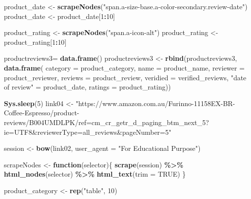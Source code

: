 \documentclass[
]{article}
\newenvironment{Shaded}{\begin{snugshade}}{\end{snugshade}}
\newcommand{\AttributeTok}[1]{\textcolor[rgb]{0.13,0.29,0.53}{#1}}
\newcommand{\ConstantTok}[1]{\textcolor[rgb]{0.56,0.35,0.01}{#1}}
\newcommand{\ControlFlowTok}[1]{\textcolor[rgb]{0.13,0.29,0.53}{\textbf{#1}}}
\newcommand{\DecValTok}[1]{\textcolor[rgb]{0.00,0.00,0.81}{#1}}
\newcommand{\FunctionTok}[1]{\textcolor[rgb]{0.13,0.29,0.53}{\textbf{#1}}}
\newcommand{\NormalTok}[1]{#1}
\newcommand{\OtherTok}[1]{\textcolor[rgb]{0.56,0.35,0.01}{#1}}
\newcommand{\SpecialCharTok}[1]{\textcolor[rgb]{0.81,0.36,0.00}{\textbf{#1}}}
\newcommand{\StringTok}[1]{\textcolor[rgb]{0.31,0.60,0.02}{#1}}
\begin{document}
\begin{Shaded}
\begin{Highlighting}[]
\NormalTok{  product\_date }\OtherTok{\textless{}{-}} \FunctionTok{scrapeNodes}\NormalTok{(}\StringTok{"span.a{-}size{-}base.a{-}color{-}secondary.review{-}date"}\NormalTok{)}
\NormalTok{  product\_date }\OtherTok{\textless{}{-}}\NormalTok{ product\_date[}\DecValTok{1}\SpecialCharTok{:}\DecValTok{10}\NormalTok{]}
  
\NormalTok{  product\_rating }\OtherTok{\textless{}{-}} \FunctionTok{scrapeNodes}\NormalTok{(}\StringTok{"span.a{-}icon{-}alt"}\NormalTok{)}
\NormalTok{  product\_rating }\OtherTok{\textless{}{-}}\NormalTok{ product\_rating[}\DecValTok{1}\SpecialCharTok{:}\DecValTok{10}\NormalTok{]}
  
\NormalTok{  productreviews3}\OtherTok{=} \FunctionTok{data.frame}\NormalTok{()}
\NormalTok{  productreviews3 }\OtherTok{\textless{}{-}} \FunctionTok{rbind}\NormalTok{(productreviews3, }\FunctionTok{data.frame}\NormalTok{(}
                      \AttributeTok{category =}\NormalTok{ product\_category,}
                      \AttributeTok{name =}\NormalTok{ product\_name,}
                      \AttributeTok{reviewer =}\NormalTok{ product\_reviewer,}
                      \AttributeTok{reviews =}\NormalTok{ product\_review,}
                      \AttributeTok{veridied =}\NormalTok{ verified\_reviews,}
                      \StringTok{"date of review"} \OtherTok{=}\NormalTok{ product\_date,}
                      \AttributeTok{ratings =}\NormalTok{ product\_rating))}
  
   \FunctionTok{Sys.sleep}\NormalTok{(}\DecValTok{5}\NormalTok{)}
\NormalTok{link04 }\OtherTok{\textless{}{-}} \StringTok{"https://www.amazon.com.au/Furinno{-}11158EX{-}BR{-}Coffee{-}Espresso/product{-}reviews/B004UMDLPK/ref=cm\_cr\_getr\_d\_paging\_btm\_next\_5?ie=UTF8\&reviewerType=all\_reviews\&pageNumber=5"}


\NormalTok{  session }\OtherTok{\textless{}{-}} \FunctionTok{bow}\NormalTok{(link02,}
               \AttributeTok{user\_agent =} \StringTok{"For Educational Purpose"}\NormalTok{)}

\NormalTok{  scrapeNodes }\OtherTok{\textless{}{-}} \ControlFlowTok{function}\NormalTok{(selector)\{}
    \FunctionTok{scrape}\NormalTok{(session) }\SpecialCharTok{\%\textgreater{}\%}
      \FunctionTok{html\_nodes}\NormalTok{(selector) }\SpecialCharTok{\%\textgreater{}\%}
      \FunctionTok{html\_text}\NormalTok{(}\AttributeTok{trim =} \ConstantTok{TRUE}\NormalTok{)}
\NormalTok{  \}}

\NormalTok{  product\_category }\OtherTok{\textless{}{-}} \FunctionTok{rep}\NormalTok{(}\StringTok{"table"}\NormalTok{, }\DecValTok{10}\NormalTok{)}


\end{Highlighting}
\end{Shaded}
\end{document}
